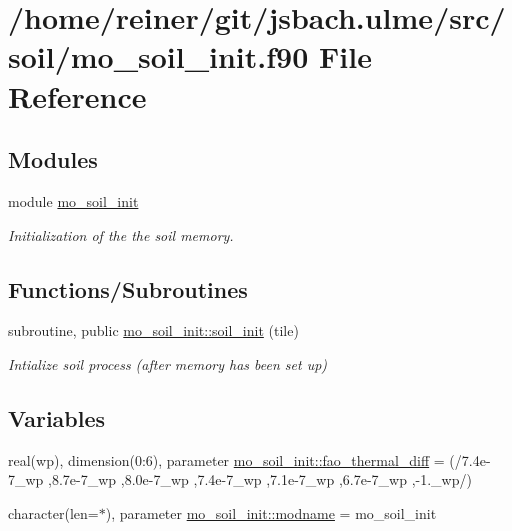 \hypertarget{mo__soil__init_8f90}{}\section{/home/reiner/git/jsbach.ulme/src/soil/mo\+\_\+soil\+\_\+init.f90 File Reference}
\label{mo__soil__init_8f90}
\subsection*{Modules}
\begin{DoxyCompactItemize}
\item 
module \hyperlink{namespacemo__soil__init}{mo\+\_\+soil\+\_\+init}
\begin{DoxyCompactList}\small\item\em Initialization of the the soil memory. \end{DoxyCompactList}\end{DoxyCompactItemize}
\subsection*{Functions/\+Subroutines}
\begin{DoxyCompactItemize}
\item 
subroutine, public \hyperlink{namespacemo__soil__init_acd283c148fd4faca32050c04a10218a3}{mo\+\_\+soil\+\_\+init\+::soil\+\_\+init} (tile)
\begin{DoxyCompactList}\small\item\em Intialize soil process (after memory has been set up) \end{DoxyCompactList}\end{DoxyCompactItemize}
\subsection*{Variables}
\begin{DoxyCompactItemize}
\item 
real(wp), dimension(0\+:6), parameter \hyperlink{namespacemo__soil__init_afcb27ae298e9ae62490306a71b798373}{mo\+\_\+soil\+\_\+init\+::fao\+\_\+thermal\+\_\+diff} = (/7.\+4e-\/7\+\_\+wp ,8.\+7e-\/7\+\_\+wp ,8.\+0e-\/7\+\_\+wp ,7.\+4e-\/7\+\_\+wp ,7.\+1e-\/7\+\_\+wp ,6.\+7e-\/7\+\_\+wp ,-\/1.\+\_\+wp/)
\item 
character(len=$\ast$), parameter \hyperlink{namespacemo__soil__init_a32fc6da5806ec1cdfa46775e465bda3a}{mo\+\_\+soil\+\_\+init\+::modname} = \textquotesingle{}mo\+\_\+soil\+\_\+init\textquotesingle{}
\end{DoxyCompactItemize}
